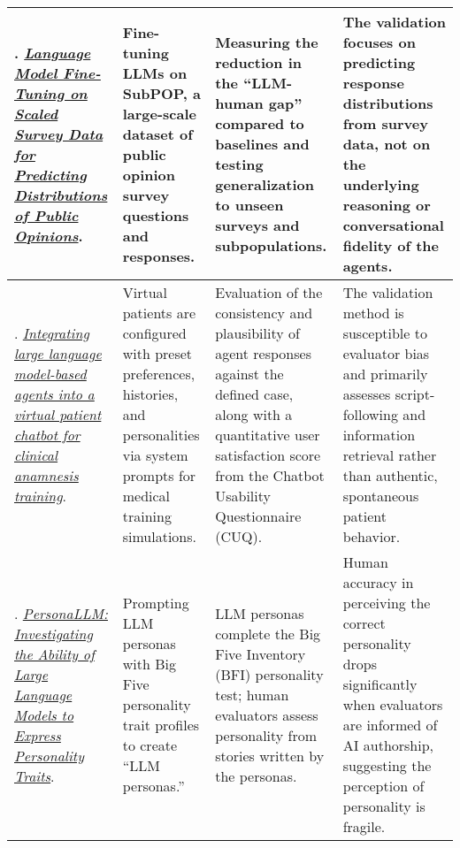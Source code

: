 {\begin{longtable}{| L{4.5cm} | L{3.5cm} | L{3.5cm} | L{3.5cm} |}
\\\hline
\citet{suh2025language}. \href{https://arxiv.org/abs/2502.16761}{\textit{Language Model Fine-Tuning on Scaled Survey Data for Predicting Distributions of Public Opinions}}. & Fine-tuning LLMs on SubPOP, a large-scale dataset of public opinion survey questions and responses. & Measuring the reduction in the ``LLM-human gap'' compared to baselines and testing generalization to unseen surveys and subpopulations. & The validation focuses on predicting response distributions from survey data, not on the underlying reasoning or conversational fidelity of the agents.
\\\hline
\citet{laverde2025integrating}. \href{https://doi.org/10.1016/j.csbj.2025.05.025}{\textit{Integrating large language model-based agents into a virtual patient chatbot for clinical anamnesis training}}. & Virtual patients are configured with preset preferences, histories, and personalities via system prompts for medical training simulations. & Evaluation of the consistency and plausibility of agent responses against the defined case, along with a quantitative user satisfaction score from the Chatbot Usability Questionnaire (CUQ). & The validation method is susceptible to evaluator bias and primarily assesses script-following and information retrieval rather than authentic, spontaneous patient behavior.
\\\hline
\citet{jiang-etal-2023-personallm}. \href{https://aclanthology.org/2024.findings-naacl.229/}{\textit{PersonaLLM: Investigating the Ability of Large Language Models to Express Personality Traits}}. & Prompting LLM personas with Big Five personality trait profiles to create ``LLM personas.'' & LLM personas complete the Big Five Inventory (BFI) personality test; human evaluators assess personality from stories written by the personas. & Human accuracy in perceiving the correct personality drops significantly when evaluators are informed of AI authorship, suggesting the perception of personality is fragile.
\\\hline

\end{longtable}
} %
